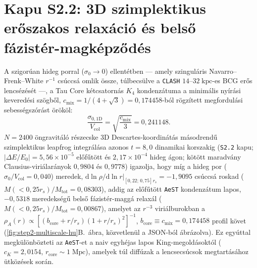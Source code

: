 \documentclass[11pt,a4paper]{article}
\begin{document}
\section{Kapu S2.2: 3D szimplektikus erőszakos relaxáció és belső fázistér-magképződés}
\label{sec:step2-relaxation-hu}
A szigorúan hideg porral ($\sigma_0 \to 0$) ellentétben --- amely szinguláris Navarro--Frenk--White $r^{-1}$ csúccsá omlik össze, túlbecsülve a \texttt{CLASH} $14\text{--}32\;\mathrm{kpc}$-es BCG erős lencsézését \cite{Tian2020} ---, a Tau Core kétcsatornás $K_4$ kondenzátuma a minimális nyírási keveredési szögből, $c_{\mathrm{mix}} = 1/(4+\sqrt{3}) = 0{,}174458$-ból rögzített megfordulási sebességszórást örököl:
\begin{equation}
    \frac{\sigma_{0,1\mathrm{D}}}{V_{\mathrm{col}}} = \sqrt{\frac{c_{\mathrm{mix}}}{3}} = 0{,}241148.
    \label{eq:turnaround-preheating-hu}
\end{equation}
$N = 2400$ öngravitáló részecske 3D Descartes-koordinátás másodrendű szimplektikus leapfrog integrálása azonos $t = 8{,}0$ dinamikai korszakig (\texttt{S2.2} kapu; $|\Delta E/E_0| = 5{,}56\times 10^{-5}$ előfűtött és $2{,}17\times 10^{-4}$ hideg ágon; kötött maradvány Clausius-viriálarányok $0{,}9804$ és $0{,}9778$) igazolja, hogy míg a hideg por ($\sigma_0/V_{\mathrm{col}} = 0{,}040$) meredek, $\mathrm{d}\ln\rho/\mathrm{d}\ln r|_{[0{,}22;\,0{,}75]r_s} = -1{,}9095$ csúccsá roskad ($M(<0{,}25r_s)/M_{\mathrm{tot}} = 0{,}08303$), addig az előfűtött \texttt{AeST} kondenzátum lapos, $-0{,}5318$ meredekségű belső fázistér-maggá relaxál ($M(<0{,}25r_s)/M_{\mathrm{tot}} = 0{,}00867$), amelyet az $r^{-3}$ viriálburokban a $\rho_A(r) \propto [(b_{\mathrm{core}} + r/r_s)(1 + r/r_s)^2]^{-1}$, $b_{\mathrm{core}} \equiv c_{\mathrm{mix}} = 0{,}174458$ profil követ (\ref{fig:step2-multiscale-hu}B.~ábra, közvetlenül a JSON-ból ábrázolva). Ez egyúttal megkülönbözteti az \texttt{AeST}-et a naiv egyhéjas lapos King-megoldásoktól ($c_K = 2{,}0154$, $r_{\mathrm{core}} \sim 1\;\mathrm{Mpc}$), amelyek túl diffúzak a lencsecsúcsok megtartásához ütközések során.
\end{document}
